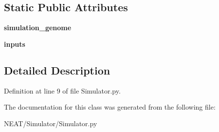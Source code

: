 \subsection*{Static Public Attributes}
\begin{DoxyCompactItemize}
\item 
{\bfseries simulation\+\_\+genome}\hypertarget{class_n_e_a_t___py_genetics_1_1_n_e_a_t_1_1_simulator_1_1_simulator_1_1_simulator_abbacbfee6def9b5025447526cfb6152d}{}\label{class_n_e_a_t___py_genetics_1_1_n_e_a_t_1_1_simulator_1_1_simulator_1_1_simulator_abbacbfee6def9b5025447526cfb6152d}

\item 
{\bfseries inputs}\hypertarget{class_n_e_a_t___py_genetics_1_1_n_e_a_t_1_1_simulator_1_1_simulator_1_1_simulator_a6ebf16f89e5a3f48064b85f3acd0c9e9}{}\label{class_n_e_a_t___py_genetics_1_1_n_e_a_t_1_1_simulator_1_1_simulator_1_1_simulator_a6ebf16f89e5a3f48064b85f3acd0c9e9}

\end{DoxyCompactItemize}


\subsection{Detailed Description}


Definition at line 9 of file Simulator.\+py.



The documentation for this class was generated from the following file\+:\begin{DoxyCompactItemize}
\item 
N\+E\+A\+T/\+Simulator/Simulator.\+py\end{DoxyCompactItemize}
